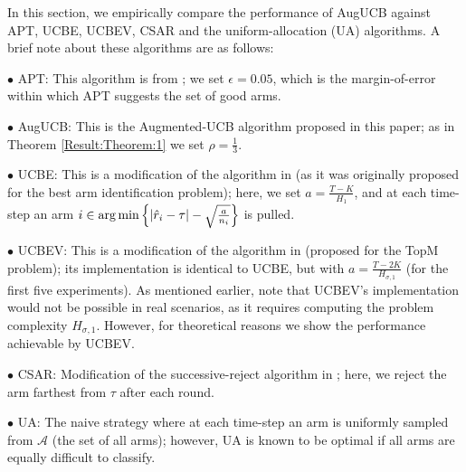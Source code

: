 
In this section, we empirically compare the  performance of AugUCB against APT, UCBE, UCBEV, CSAR and the uniform-allocation (UA) algorithms. A brief note about these algorithms are as follows:

$\bullet$ APT: This algorithm is from \cite{locatelli2016optimal}; we set $\epsilon=0.05$, which is the margin-of-error within which APT suggests the set of good arms.

$\bullet$ AugUCB: This is the Augmented-UCB algorithm proposed in this paper; as in Theorem \ref{Result:Theorem:1} we set $\rho=\frac{1}{3}$.

$\bullet$ UCBE: This is a modification of the algorithm in \cite{audibert2009exploration} (as it was originally proposed for the best arm identification problem); here, we set $a=\frac{T-K}{H_1}$, and at each time-step an arm $i\in\operatorname*{arg\,min}\left\lbrace |\hat{r}_{i} -\tau|-\sqrt{\frac{a}{n_{i}}} \right\rbrace$ is pulled.

$\bullet$ UCBEV: This is a modification of the algorithm in \cite{gabillon2011multi} (proposed for the TopM problem); its implementation is identical to UCBE, but with $a = \frac{T-2K}{H_{\sigma,1}}$ (for the first five experiments). As mentioned earlier, note that UCBEV's implementation would not be possible in real scenarios, as it requires computing the problem complexity $H_{\sigma,1}$. However, for theoretical reasons we show the performance achievable by UCBEV.

$\bullet$ CSAR:  Modification of the successive-reject algorithm in \cite{chen2014combinatorial}; here, we reject the arm farthest from $\tau$ after each round. 

$\bullet$ UA: The naive strategy where at each time-step an arm is uniformly sampled from $\mathcal{A}$ (the set of all arms); however, UA is known to be optimal if all arms are equally difficult to classify. 


